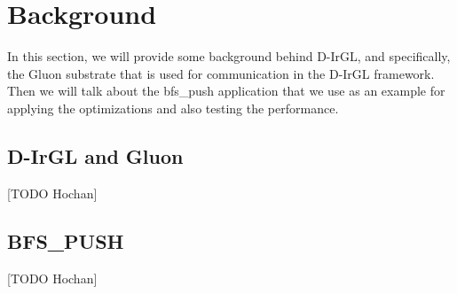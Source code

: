 \section{Background}

In this section, we will provide some background behind D-IrGL, and specifically, the Gluon substrate that is used for communication in the D-IrGL framework. Then we will talk about the bfs\_push application that we use as an example for applying the optimizations and also testing the performance. 

\subsection{D-IrGL and Gluon}
[TODO Hochan]
\subsection{BFS\_PUSH}
[TODO Hochan]